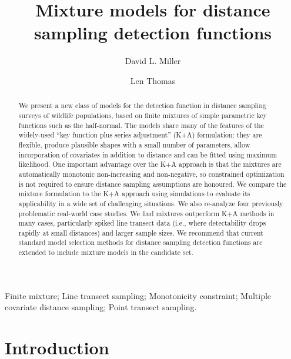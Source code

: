 \documentclass[authoryear,preprint,review,12pt]{elsarticle}
\begin{document}
\begin{frontmatter}
\title{Mixture models for distance sampling detection functions}
\author[creem]{David L. Miller}
\address[creem]{School of Mathematics and Statistics, and \\
Centre for Research into Ecological and Environmental Modelling,\\
University of St Andrews, St Andrews KY16 9LZ, Scotland}
\author[creem]{Len Thomas}


\begin{abstract}
We present a new class of models for the detection function in distance sampling surveys of wildlife populations, based on finite mixtures of simple parametric key functions such as the half-normal. The models share many of the features of the widely-used ``key function plus series adjustment'' (K+A) formulation: they are flexible, produce plausible shapes with a small number of parameters, allow incorporation of covariates in addition to distance and can be fitted using maximum likelihood. One important advantage over the K+A approach is that the mixtures are automatically monotonic non-increasing and non-negative, so constrained optimization is not required to ensure distance sampling assumptions are honoured. We compare the mixture formulation to the K+A approach using simulations to evaluate its applicability in a wide set of challenging situations. We also re-analyze four previously problematic real-world case studies.  We find mixtures outperform K+A methods in many cases, particularly spiked line transect data (i.e., where detectability drops rapidly at small distances) and larger sample sizes.  We recommend that current standard model selection methods for distance sampling detection functions are extended to include mixture models in the candidate set.
\end{abstract}

\begin{keyword}
Finite mixture; Line transect sampling; Monotonicity constraint; Multiple covariate distance sampling; Point transect sampling.
\end{keyword}

\end{frontmatter}

\section{Introduction}
\label{s:intro}
\end{document}
